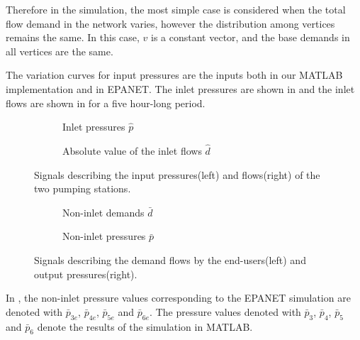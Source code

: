 Therefore in the simulation, the most simple case is considered when the total flow demand in the network varies, however the distribution among vertices remains the same. In this case, $v$ is a constant vector, and the base demands in all vertices are the same. 

The variation curves for input pressures are the inputs both in our MATLAB implementation and in EPANET. The inlet pressures are shown in  and the inlet flows are shown in  for a five hour-long period.

\begin{figure}[H]
\centering
\begin{subfigure}{.49\textwidth}
\centering
   
  \caption{Inlet pressures $\hat{p}$}
  \label{fig:sub11_example1}
\end{subfigure}
\begin{subfigure}{.49\textwidth}
\centering
   
  \caption{Absolute value of the inlet flows $\hat{d}$}
  \label{fig:sub22_example1}
\end{subfigure}
\caption{Signals describing the input pressures(left) and flows(right) of the two pumping stations.}
\label{fig:inlet_pressures_demands}
\end{figure}

\begin{figure}[H]
\centering
\begin{subfigure}{.49\textwidth}
\centering
   
  \caption{Non-inlet demands $\bar{d}$}
  \label{fig:sub21_example1}
\end{subfigure}
\begin{subfigure}{.49\textwidth}
\centering
   
  \caption{Non-inlet pressures $\bar{p}$}
  \label{fig:sub22_example1}
\end{subfigure}
\caption{Signals describing the demand flows by the end-users(left) and output pressures(right).}
\label{fig:noninlet_demands_noninlet_pressures}
\end{figure}
\vspace{-3mm}

In , the non-inlet pressure values corresponding to the EPANET simulation are denoted with $\bar{p}_{3e}$, $\bar{p}_{4e}$, $\bar{p}_{5e}$ and $\bar{p}_{6e}$. The pressure values denoted with $\bar{p}_{3}$, $\bar{p}_{4}$, $\bar{p}_{5}$ and $\bar{p}_{6}$ denote the results of the simulation in MATLAB. 

